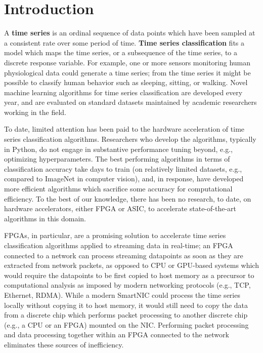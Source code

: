 \section{Introduction}
\label{sec:Introduction}

A \textbf{time series} is an ordinal sequence of data points which have been sampled at a consistent rate over some period of time. \textbf{Time series classification} fits a model which maps the time series, or a subsequence of the time series, to a discrete response variable. For example, one or more sensors monitoring human physiological data could generate a time series; from the time series it might be possible to classify human behavior such as sleeping, sitting, or walking. Novel machine learning algorithms for time series classification are developed every year, and are evaluated on standard datasets maintained by academic researchers working in the field. 

To date, limited attention has been paid to the hardware acceleration of time series classification algorithms. Researchers who develop the algorithms, typically in Python, do not engage in substantive performance tuning beyond, e.g., optimizing hyperparameters. The best performing algorithms in terms of classification accuracy take days to train (on relatively limited datasets, e.g., compared to ImageNet in computer vision), and, in response, have developed more efficient algorithms which sacrifice some accuracy for computational efficiency. To the best of our knowledge, there has been no research, to date, on hardware accelerators, either FPGA or ASIC, to accelerate state-of-the-art algorithms in this domain. 

FPGAs, in particular, are a promising solution to accelerate time series classification algorithms applied to streaming data in real-time; an FPGA connected to a network can process streaming datapoints as soon as they are extracted from network packets, as opposed to CPU or GPU-based systems which would require the datapoints to be first copied to host memory as a precursor to computational analysis as imposed by modern networking protocols (e.g., TCP, Ethernet, RDMA). While a modern SmartNIC could process the time series locally without copying it to host memory, it would still need to copy the data from a discrete chip which performs packet processing to another discrete chip (e.g., a CPU or an FPGA) mounted on the NIC. Performing packet processing and data processing together within an FPGA connected to the network eliminates these sources of inefficiency. 


